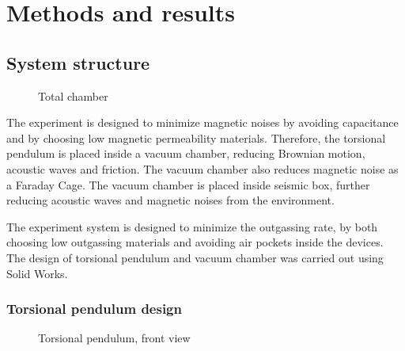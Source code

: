\documentclass[\main/master.tex]{subfiles}
\begin{document}
\chapter{Methods and results}\label{chapter:Methods and results}

\section{System structure}
\begin{figure}[htbp]
	\centering
	\caption[Total chamber]{Total chamber}
	\label{fig:Total chamber}
\end{figure}
\FloatBarrier
\par\noindent
The experiment is designed to minimize magnetic noises by avoiding capacitance and by choosing low magnetic permeability materials. Therefore, the torsional pendulum is placed inside a vacuum chamber, reducing Brownian motion, acoustic waves and friction. The vacuum chamber also reduces magnetic noise as a Faraday Cage. The vacuum chamber is placed inside seismic box, further reducing acoustic waves and magnetic noises from the environment.

\par\noindent
The experiment system is designed to minimize the outgassing rate, by both choosing low outgassing materials and avoiding air pockets inside the devices. The design of torsional pendulum and vacuum chamber was carried out using Solid Works.

\subsection{Torsional pendulum design}
\begin{figure}[htbp]
	\centering
	\caption[Torsional pendulum, front view]{Torsional pendulum, front view}
	\label{fig:pendulum front}
\end{figure}
\FloatBarrier
\end{document}
